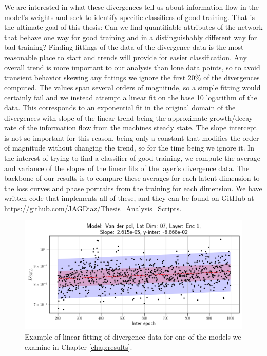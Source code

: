 We are interested in what these divergences tell us about information flow in the model's weights and 
seek to identify specific classifiers of good training. That is the ultimate goal of this thesis: 
Can we find quantifiable attributes of the network that behave one way for good training and in a 
distinguishably different way for bad training? Finding fittings of the data of the divergence data
is the most reasonable place to start and trends will provide for easier classification. Any overall trend
is more important to our analysis than lone data points, so to avoid transient behavior skewing any fittings
we ignore the first 20\% of the divergences computed. The values span several orders of magnitude, so a simple 
fitting would certainly fail and we instead attempt a linear fit on the base 10 logarithm of the data. This 
corresponds to an exponential fit in the original domain of the divergences with slope of the linear trend 
being the approximate growth/decay rate of the information flow from the machines steady state. The slope 
intercept is not so important for this reason, being only a constant that modifies the order of magnitude 
without changing the trend, so for the time being we ignore it. In the interest of trying to find a 
classifier of good training, we compute the average and variance of the slopes of the linear fits of 
the layer's divergence data. The backbone of our results is to compare these averages for each latent 
dimension to the loss curves and phase portraits from the training for each dimension.
We have written code that implements all of these, and they can be found on GitHub at
\href{https://github.com/JAGDiaz/Thesis_Analysis_Scripts}{https://github.com/JAGDiaz/Thesis\_Analysis\_Scripts}.

\begin{figure}[hbt!]
    \centering
    \begin{minipage}{\textwidth}
        \includegraphics[width=\textwidth]{"../Figures/van_der_pol_07_div_plot_linear_enc_1.png"}
    \end{minipage}
    \caption{Example of linear fitting of divergence data for one of the models we examine in Chapter
    \ref{chap:results}.}
    \label{fig:divergence of model example}
\end{figure}


